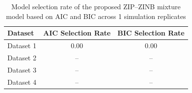 \begin{table}[!h]
\caption{Model selection rate of the proposed ZIP--ZINB mixture model based on AIC and BIC across 1 simulation replicates}
\centering
\begin{tabular}{lcc}
\toprule
Dataset & AIC Selection Rate & BIC Selection Rate \\
\midrule
Dataset 1 & 0.00 & 0.00 \\
Dataset 2 & -- & -- \\
Dataset 3 & -- & -- \\
Dataset 4 & -- & -- \\
\bottomrule
\end{tabular}
\label{tab:sim_selection}
\end{table}
